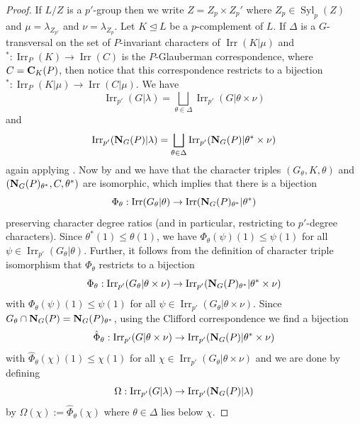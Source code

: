 \documentclass[12pt]{amsart}
\theoremstyle{plain}
\theoremstyle{definition}
\numberwithin{equation}{section}
\newcommand{\normal}{\trianglelefteq}
\newcommand{\Syl}{\operatorname{Syl}}
\newcommand{\Irr}{\operatorname{Irr}}
\def\cent#1#2{{\bf C}_{#1}(#2)}
\def\norm#1#2{{\bf N}_{#1}(#2)}
\begin{document}
\begin{proof}
If $L/Z$ is a $p'$-group then we write $Z=Z_p\times Z_p'$ where
$Z_p\in\Syl_p(Z)$ and $\mu=\lambda_{Z_{p'}}$ and
$\nu=\lambda_{Z_p}$. Let $K\normal L$ be a $p$-complement of $L$. If
$\Delta$ is a $G$-transversal on the set of $P$-invariant characters
of $\Irr(K|\mu)$ and $^*:\Irr_P(K)\rightarrow\Irr(C)$ is the
$P$-Glauberman correspondence, where $C=\cent K P$, then notice that
this correspondence restricts to a bijection
$^*:\Irr_P(K|\mu)\rightarrow\Irr(C|\mu)$. We have
$$\Irr_{p'}(G|\lambda)=\bigsqcup_{\theta\in\Delta}\Irr_{p'}(G|\theta\times\nu)$$ and
$$\Irr_{p'}(\norm G P|\lambda)=\bigsqcup_{\theta\in\Delta}\Irr_{p'}(\norm G P|\theta^*\times\nu)$$
again applying \cite[Lemma 9.3]{N}. Now by \cite[Theorem~6.5]{T08}
and \cite[Theorem~7.12]{T09} we have that the character triples
$(G_\theta,K,\theta)$ and $(\norm G P_{\theta^*},C,\theta^*)$ are
isomorphic, which implies that there is a bijection
$$\Phi_\theta:\Irr(G_\theta|\theta)\rightarrow\Irr(\norm G P_{\theta^*}|\theta^*)$$
preserving character degree ratios (and in particular, restricting
to $p'$-degree characters). Since $\theta^*(1)\leq \theta(1)$, we
have $\Phi_\theta(\psi)(1)\leq\psi(1)$ for all
$\psi\in\Irr_{p'}(G_\theta|\theta)$. Further, it follows from the
definition of character triple isomorphism that $\Phi_\theta$
restricts to a bijection
$$\Phi_\theta:\Irr_{p'}(G_\theta|\theta\times\nu)\rightarrow\Irr_{p'}(\norm G P_{\theta^*}|\theta^*\times\nu)$$ with $\Phi_\theta(\psi)(1)\leq\psi(1)$ for all $\psi\in\Irr_{p'}(G_\theta|\theta\times\nu)$. Since $G_\theta\cap\norm G P=\norm G P_{\theta^*}$, using the Clifford correspondence we find a bijection
$$\hat\Phi_\theta:\Irr_{p'}(G|\theta\times\nu)\rightarrow\Irr_{p'}(\norm G P|\theta^*\times\nu)$$ with $\hat\Phi_\theta(\chi)(1)\leq\chi(1)$ for all $\chi\in\Irr_{p'}(G_\theta|\theta\times\nu)$ and we are done by defining
$$\Omega:\Irr_{p'}(G|\lambda)\rightarrow\Irr_{p'}(\norm G P|\lambda)$$
by $\Omega(\chi):=\hat\Phi_\theta(\chi)$ where $\theta\in\Delta$
lies below $\chi$.


\end{proof}
\end{document}
